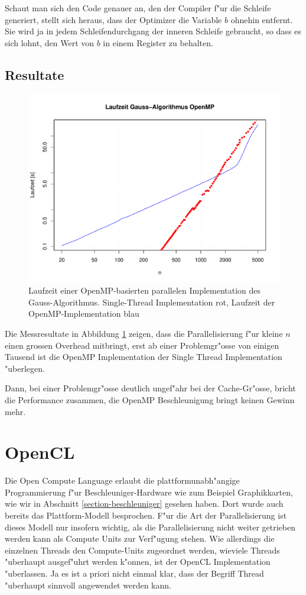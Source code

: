 Schaut man sich den Code genauer an, den der Compiler f"ur die Schleife
generiert, stellt sich heraus, dass der Optimizer die Variable $b$
ohnehin entfernt. Sie wird ja in jedem Schleifendurchgang der inneren
Schleife gebraucht, so dass es sich lohnt, den Wert von $b$ in einem
Register zu behalten.

\subsection{Resultate}
\begin{figure}
\begin{center}
\includegraphics[width=\hsize]{images/gauss-openmp.pdf}
\end{center}
\caption{Laufzeit einer OpenMP-basierten parallelen Implementation
des Gauss-Algorithmus.
Single-Thread Implementation rot, Laufzeit der OpenMP-Implementation
blau\label{openmp-performance}}
\end{figure}
Die Messresultate in Abbildung \ref{openmp-performance}
zeigen, dass die Parallelisierung f"ur kleine $n$
einen grossen Overhead mitbringt, erst ab einer Problemgr"osse von
einigen Tausend ist die OpenMP Implementation der Single Thread
Implementation "uberlegen.

Dann, bei einer Problemgr"osse deutlich ungef"ahr bei der Cache-Gr"osse,
bricht die Performance zusammen, die OpenMP Beschleunigung bringt
keinen Gewinn mehr.

\section{OpenCL\label{opencl-intro}}
Die Open Compute Language erlaubt die plattformunabh"angige Programmierung
f"ur Beschleuniger-Hardware wie zum Beispiel Graphikkarten, wie wir
in Abschnitt \ref{section-beschleuniger} gesehen haben. 
Dort wurde auch bereits das Plattform-Modell besprochen.
F"ur die Art der Parallelisierung ist dieses Modell nur insofern wichtig,
als die Parallelisierung nicht weiter getrieben werden kann als Compute
Units zur Verf"ugung stehen.
Wie allerdings die einzelnen Threads den Compute-Units zugeordnet werden,
wieviele Threads "uberhaupt ausgef"uhrt werden k"onnen, ist der
OpenCL Implementation "uberlassen.
Ja es ist a priori nicht einmal klar, dass der Begriff Thread "uberhaupt
sinnvoll angewendet werden kann.

